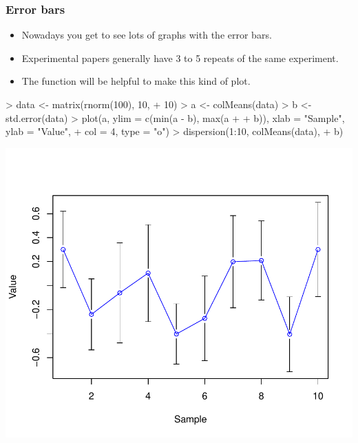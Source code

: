 \begin{frame}
  \frametitle{Error bars}
  \begin{itemize}
  \item Nowadays you get to see lots of graphs with the error bars.
  \item Experimental papers generally have 3 to 5 repeats of the same experiment.
  \item The  function will be helpful to make this kind of plot.
  \end{itemize}
\begin{Schunk}
\begin{Sinput}
> data <- matrix(rnorm(100), 10, 
+     10)
> a <- colMeans(data)
> b <- std.error(data)
> plot(a, ylim = c(min(a - b), max(a + 
+     b)), xlab = "Sample", ylab = "Value", 
+     col = 4, type = "o")
> dispersion(1:10, colMeans(data), 
+     b)
\end{Sinput}
\end{Schunk}
\includegraphics{plots/fig-028}
\end{frame}

